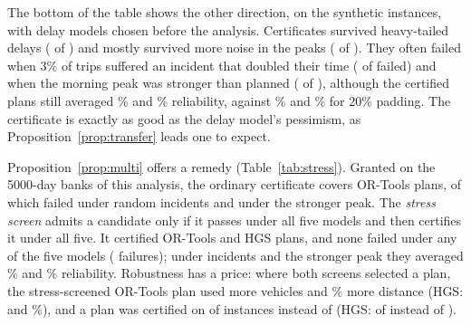 \documentclass[11pt,a4paper]{article}
\theoremstyle{remark}
\begin{document}
The bottom of the table shows the other direction, on the synthetic instances, with
delay models chosen before the analysis. Certificates survived heavy-tailed delays
(\WrTailKept{} of \WrTailCert) and mostly survived more noise in the peaks
(\WrNoiseKept{} of \WrNoiseCert). They often failed when 3\% of trips suffered an
incident that doubled their time (\WrIncFailed{} of \WrIncCert{} failed) and when the
morning peak was stronger than planned (\WrPeakFailed{} of \WrPeakCert{}), although
the certified plans still averaged \WrIncServ\% and \WrPeakServ\% reliability, against
\WrIncPad\% and \WrPeakPad\% for 20\% padding. The certificate is exactly as good as
the delay model's pessimism, as Proposition~\ref{prop:transfer} leads one to expect.



Proposition~\ref{prop:multi} offers a remedy (Table~\ref{tab:stress}). Granted on the
5000-day banks of this analysis, the ordinary certificate covers \StOSingle{} OR-Tools
plans, of which \StOSingleIncFail{} failed under random incidents and
\StOSinglePeakFail{} under the stronger peak. The \emph{stress screen} admits a candidate
only if it passes under all five models and then certifies it under all five. It
certified \StOStress{} OR-Tools and \StHStress{} HGS plans, and none failed under any of
the five models (\StStressFails{} failures); under incidents and the stronger peak they
averaged \StOIncServ\% and \StOPeakServ\% reliability. Robustness has a price: where
both screens selected a plan, the stress-screened OR-Tools plan used \StOFleet{} more
vehicles and \StODist\% more distance (HGS: \StHFleet{} and \StHDist\%), and a plan
was certified on \StOStress{} of \StOInst{} instances instead of \StOSingle{} (HGS:
\StHStress{} of \StHInst{} instead of \StHSingle).
\end{document}
